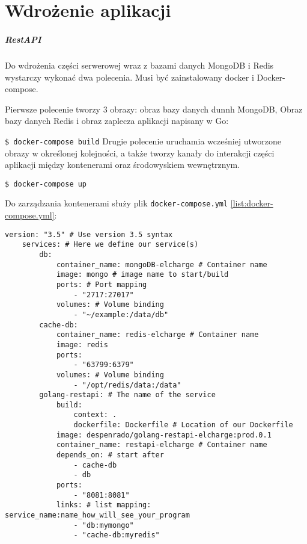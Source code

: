 \chapter{Wdrożenie aplikacji}
\paragraph{RestAPI}

Do wdrożenia części serwerowej wraz z bazami danych MongoDB i Redis wystarczy wykonać dwa polecenia.
Musi być zainstalowany docker i Docker-compose.

Pierwsze polecenie tworzy 3 obrazy: obraz bazy danych dunnh MongoDB, Obraz bazy danych Redis i obraz zaplecza aplikacji napisany w Go:

\texttt{\$ docker-compose build}
Drugie polecenie uruchamia wcześniej utworzone obrazy w określonej kolejności, a także tworzy kanały do interakcji części aplikacji między kontenerami oraz środowyskiem wewnętrznym.

\texttt{\$ docker-compose up}

Do zarządzania kontenerami służy plik \texttt{docker-compose.yml} \ref{list:docker-compose.yml}:
\begin{lstlisting}[label=list:docker-compose.yml,caption=docker-compose.yml,basicstyle=\tiny\ttfamily]
    version: "3.5" # Use version 3.5 syntax
    services: # Here we define our service(s)
        db:
            container_name: mongoDB-elcharge # Container name
            image: mongo # image name to start/build
            ports: # Port mapping
                - "2717:27017"
            volumes: # Volume binding
                - "~/example:/data/db"
        cache-db:
            container_name: redis-elcharge # Container name
            image: redis
            ports:
                - "63799:6379"
            volumes: # Volume binding
                - "/opt/redis/data:/data"
        golang-restapi: # The name of the service
            build:
                context: .
                dockerfile: Dockerfile # Location of our Dockerfile
            image: despenrado/golang-restapi-elcharge:prod.0.1
            container_name: restapi-elcharge # Container name
            depends_on: # start after
                - cache-db
                - db
            ports:
                - "8081:8081"
            links: # list mapping: service_name:name_how_will_see_your_program
                - "db:mymongo"
                - "cache-db:myredis"
    
\end{lstlisting}

